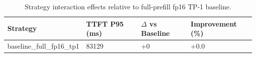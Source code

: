 \begin{table}
\caption{Strategy interaction effects relative to full-prefill fp16 TP-1 baseline.}
\label{tab:interactions}
\begin{tabular}{llll}
\toprule
Strategy & TTFT P95 (ms) & $\Delta$ vs Baseline & Improvement (\%) \\
\midrule
baseline\_full\_fp16\_tp1 & 83129 & +0 & +0.0 \\
\bottomrule
\end{tabular}
\end{table}
